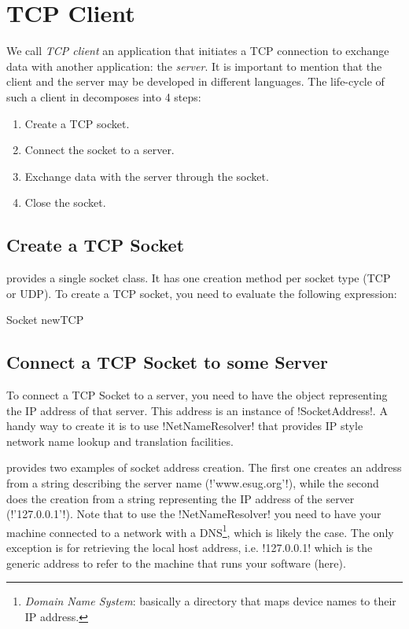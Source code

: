 \documentclass[a4paper,10pt,twoside]{book}
\begin{document}
\section{TCP Client}
\label{sec:clientTcpSocket}
We call \textit{TCP client}  an application that initiates a TCP connection to exchange data with another application: the \textit{server}.
It is important to mention that the client and the server may be developed in different languages.
The life-cycle of such a client in \pharo decomposes into 4 steps:
\begin{enumerate}
\item Create a TCP socket.
\item Connect the socket to a server.
\item Exchange data with the server through the socket.
\item Close the socket.
\end{enumerate}

\subsection{Create a TCP Socket}
\pharo provides a single socket class.
It has one creation method per socket type (TCP or UDP).
To create a TCP socket, you need to evaluate the following expression:
\begin{code}{}
Socket newTCP
\end{code}

\subsection{Connect a TCP Socket to some Server}
To connect a TCP Socket to a server, you need to have the object representing the IP address of that server. This address is an instance of \ct!SocketAddress!.
A handy way to create it is to use \ct!NetNameResolver! that  provides IP style network name lookup and translation facilities.

 provides two examples of socket address creation.
The first one creates an address from a string describing the server name (\ct!'www.esug.org'!), while the second does the creation from a string representing the  IP address of the server (\ct!'127.0.0.1'!).
Note that to use the \ct!NetNameResolver! you need to have your machine connected to a network with a DNS\footnote{\emph{Domain Name System}: basically a directory that maps device names to their IP address.}, which is likely the case.
The only exception is for retrieving the local host address, i.e. \ct!127.0.0.1! which is the generic address to refer to the machine that runs your software (\pharo here).
\end{document}
